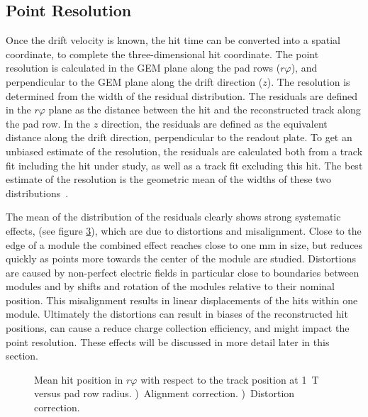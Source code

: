 \documentclass[preprint]{elsarticle}
\begin{document}
\subsection{Point Resolution}
Once the drift velocity is known, the hit time can be converted into a spatial coordinate, to complete the three-dimensional hit coordinate. The point resolution is calculated in the GEM plane along the pad rows ($r\varphi$), and perpendicular to the GEM plane along the drift direction ($z$). The resolution is determined from the width of the residual distribution. The residuals are defined in the $r\varphi$ plane as the distance between the hit and the reconstructed track along the pad row. In the $z$ direction, the residuals are defined as the equivalent distance along the drift direction, perpendicular to the readout plate. To get an unbiased estimate of the resolution, the residuals are calculated both from a track fit including the hit under study, as well as a track fit excluding this hit. The best estimate of the resolution is the geometric mean of the widths of these two distributions~\cite{resolution}. 


The mean of the distribution of the residuals clearly shows strong systematic effects, (see figure \ref{fig:align1Tdistort}), 
which are due to distortions and misalignment. Close to the edge of a module the combined effect reaches close to one mm in size, but reduces quickly as points more towards the center of the module are studied. 
Distortions are caused by non-perfect electric fields in particular close to boundaries between modules and by shifts and rotation of the modules relative to their nominal position. This misalignment results in linear displacements of the hits within one module.
Ultimately the distortions can result in biases of the reconstructed hit positions, can cause a reduce charge collection efficiency, and might impact the point resolution. These effects will be discussed in more detail later in this section. 
\begin{figure}[tb]
\begin{subfigure}[b]{0.48\textwidth}
\iftoggle{blackandwhite}{\texttt{[image: figures/distortionAlignmentPaper1TalignBW.pdf]}}{\texttt{[image: figures/distortionAlignmentPaper1Talign.pdf]}}
\caption{}
\label{sfig:1Talign}
\end{subfigure}
\hfill
\begin{subfigure}[b]{0.48\textwidth}
\iftoggle{blackandwhite}{\texttt{[image: figures/distortionAlignmentPaper1TdistcorZoomBW.pdf]}}{\texttt{[image: figures/distortionAlignmentPaper1TdistcorZoom.pdf]}}
\caption{}
\label{sfig:1Tdistort}
\end{subfigure}
\caption{\small Mean hit position in $r\varphi$ with respect to the track position at \SI{1}{\tesla} versus pad row radius. \protect{})~Alignment correction. \protect{})~Distortion correction.}
\label{fig:align1Tdistort}
\end{figure}
\end{document}
